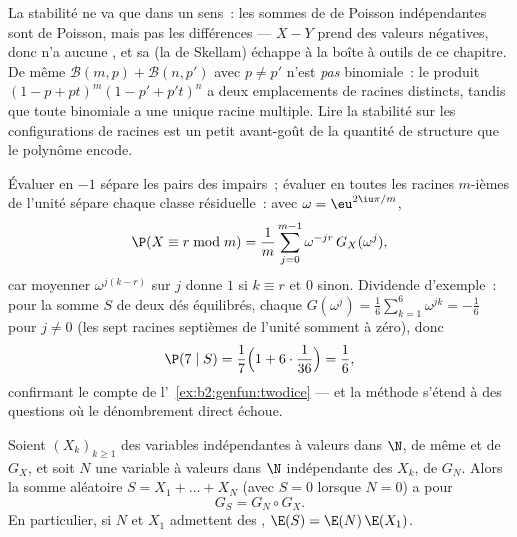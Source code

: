 \begin{remark}
La stabilité ne va que dans un sens~: les sommes de  de Poisson
indépendantes sont de Poisson, mais pas les différences --- $X - Y$
prend des valeurs négatives, donc n'a aucune , et
sa  (la  de Skellam) échappe à la boîte à outils de ce chapitre.
De même $\mathcal B(m, p) + \mathcal B(n, p')$ avec
$p \neq p'$ n'est \emph{pas} binomiale~: le produit $(1 - p +
pt)^m(1 - p' + p't)^n$ a deux emplacements de racines distincts,
tandis que toute  binomiale a une unique racine
multiple. Lire la stabilité sur les configurations de racines est un
petit avant-goût de la quantité de structure que le polynôme encode.
\end{remark}

\begin{remark}
Évaluer en $-1$ sépare les pairs des impairs~; évaluer en toutes
les racines $m$-ièmes de l'unité sépare chaque classe résiduelle~: avec
$\omega = \eu^{2\iu\pi/m}$,
\[
\P(X \equiv r \bmod m)
= \frac1m\sum_{j=0}^{m-1}\omega^{-jr}\,G_X(\omega^j),
\]
car moyenner $\omega^{j(k-r)}$ sur $j$ donne $1$ si $k
\equiv r$ et $0$ sinon. Dividende d'exemple~: pour la somme $S$
de deux dés équilibrés, chaque $G(\omega^j) = \frac16\sum_{k=1}^6
\omega^{jk} = -\frac16$ pour $j \neq 0$ (les sept racines
septièmes de l'unité somment à zéro), donc
\[
\P(7 \mid S) = \frac17\Bigl(1 +
6\cdot\frac1{36}\Bigr) = \frac16 ,
\]
confirmant le compte de l'~\cref{ex:b2:genfun:twodice} ---
et la méthode s'étend à des questions où le dénombrement direct
échoue.
\end{remark}

\begin{theorem}\label{thm:b2:genfun:compound}
Soient $(X_k)_{k\geq1}$ des variables indépendantes à valeurs dans
$\N$, de même  et de  $G_X$, et soit $N$ une
variable à valeurs dans $\N$ indépendante des $X_k$, de  $G_N$. Alors la somme aléatoire $S = X_1 + \dots + X_N$
(avec $S = 0$ lorsque $N = 0$) a pour 
\[
G_S = G_N \circ G_X .
\]
En particulier, si $N$ et $X_1$ admettent des , $\E(S) =
\E(N)\,\E(X_1)$.
\end{theorem}

